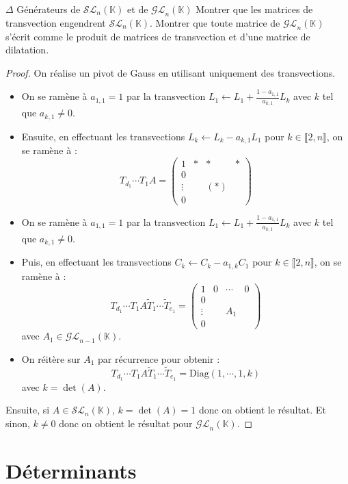 \documentclass[french,a4paper]{article}
\newcommand{\K}{\mathbb{K}}
\theoremstyle{plain}
\theoremstyle{definition}
\theoremstyle{remark}
\begin{document}
\begin{ex}[]{$\Delta$ Générateurs de $\mathcal{SL}_n(\K)$ et de $\mathcal{GL}_n(\K)$}
	Montrer que les matrices de transvection engendrent $\mathcal{SL}_n(\K)$. Montrer que toute matrice de $\mathcal{GL}_n(\K)$ s'écrit comme le produit de matrices de transvection et d'une matrice de dilatation.
\end{ex}
\begin{proof}
	On réalise un pivot de Gauss en utilisant uniquement des transvections.
	\begin{itemize}
		\item On se ramène à $a_{1,1}=1$ par la transvection $L_1\leftarrow\displaystyle L_1+\frac{1-a_{1,1}}{a_{k,1}}L_k$ avec $k$ tel que $a_{k,1}\ne 0$.
		\item Ensuite, en effectuant les transvections $L_k\leftarrow L_k-a_{k,1}L_1$ pour $k\in\llbracket2,n\rrbracket$, on se ramène à : $$T_{d_1}\cdots T_1A=\begin{pmatrix}
			1&*&*&*\\
			0&&&\\
			\vdots&&(*)&\\
			0&&&
		\end{pmatrix}$$
		\item On se ramène à $a_{1,1}=1$ par la transvection $L_1\leftarrow\displaystyle L_1+\frac{1-a_{1,1}}{a_{k,1}}L_k$ avec $k$ tel que $a_{k,1}\ne 0$.
		\item Puis, en effectuant les transvections $C_k\leftarrow C_k-a_{1,k}C_1$ pour $k\in\llbracket2,n\rrbracket$, on se ramène à : $$T_{d_1}\cdots T_1A\tilde{T}_{1}\cdots\tilde{T}_{e_1}=\begin{pmatrix}
			1&0&\cdots&0\\
			0&&&\\
			\vdots&&A_1&\\
			0&&&
		\end{pmatrix}$$ avec $A_1\in\mathcal{GL}_{n-1}(\K)$.
		\item On réitère sur $A_1$ par récurrence pour obtenir :  $$T_{d_1}\cdots T_1A\tilde{T}_{1}\cdots\tilde{T}_{e_1}=\text{Diag}(1,\cdots,1,k)$$ avec $k=\det(A)$.
	\end{itemize}
	Ensuite, si $A\in\mathcal{SL}_n(\K)$, $k=\det(A)=1$ donc on obtient le résultat. Et sinon, $k\ne 0$ donc on obtient le résultat pour $\mathcal{GL}_n(\K)$.
\end{proof}

\section{Déterminants}
\end{document}
